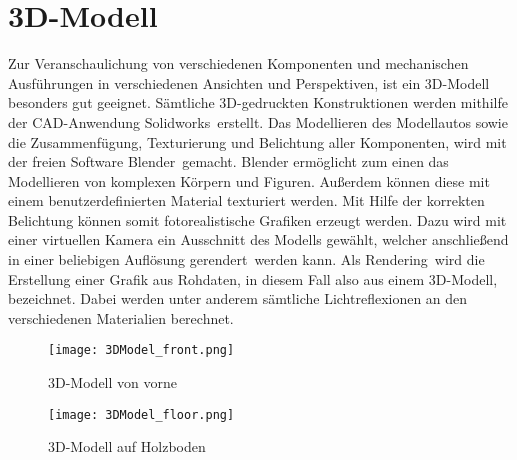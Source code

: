 \section{3D-Modell}
\label{sec:3Dmodel}
Zur Veranschaulichung von verschiedenen Komponenten und mechanischen Ausführungen in verschiedenen Ansichten und Perspektiven, ist ein 3D-Modell besonders gut geeignet. Sämtliche 3D-gedruckten Konstruktionen werden mithilfe der \ac{CAD}-Anwendung \glqq Solidworks\grqq\ erstellt. Das Modellieren des Modellautos sowie die Zusammenfügung, Texturierung und Belichtung aller Komponenten, wird mit der freien Software \glqq Blender\grqq\ gemacht. Blender ermöglicht zum einen das Modellieren von komplexen Körpern und Figuren. Außerdem können diese mit einem benutzerdefinierten Material texturiert werden. Mit Hilfe der korrekten Belichtung können somit fotorealistische Grafiken erzeugt werden. Dazu wird mit einer virtuellen Kamera ein Ausschnitt des Modells gewählt, welcher anschließend in einer beliebigen Auflösung \glqq gerendert\grqq\ werden kann. Als \glqq Rendering\grqq\ wird die Erstellung einer Grafik aus Rohdaten, in diesem Fall also aus einem 3D-Modell, bezeichnet. Dabei werden unter anderem sämtliche Lichtreflexionen an den verschiedenen Materialien berechnet.
\begin{figure}[h]
\centering
\texttt{[image: 3DModel\_front.png]}
\caption{\ac{3D}-Modell von vorne}
\label{fig:3DFront}
\end{figure}

\begin{figure}[h]
\centering
\texttt{[image: 3DModel\_floor.png]}
\caption{\ac{3D}-Modell auf Holzboden}
\label{fig:3DWood}
\end{figure}